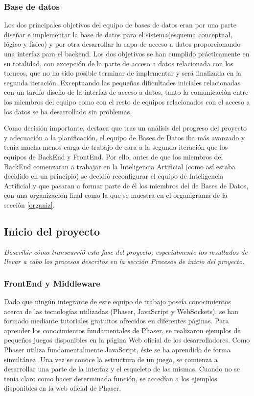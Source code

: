 \subsubsection*{Base de datos}
Los dos principales objetivos del equipo de bases de datos eran por una parte diseñar e implementar la base de datos para el sistema(esquema conceptual, lógico y físico) y por otra desarrollar la capa de acceso a datos proporcionando una interfaz para el backend. Los dos objetivos se han cumplido prácticamente en su totalidad, con excepción de la parte de acceso a datos relacionada con los torneos, que no ha sido posible terminar de implementar y será finalizada en la segunda iteración. Exceptuando las pequeñas dificultades iniciales relacionadas con un tardío diseño de la interfaz de acceso a datos, tanto la comunicación entre los miembros del equipo como con el resto de equipos relacionados con el acceso a los datos se ha desarrollado sin problemas.

Como decisión importante, destaca que tras un análisis del progreso del proyecto y adecuación a la planificación, el equipo de Bases de Datos iba más avanzado y tenía mucha menos carga de trabajo de cara a la segunda iteración que los equipos de BackEnd y FrontEnd. Por ello, antes de que los miembros del BackEnd comenzaran a trabajar en la Inteligencia Artificial (como así estaba decidido en un principio) se decidió reconfigurar el equipo de Inteligencia Artificial y que pasaran a formar parte de él los miembros del de Bases de Datos, con una organización final como la que se muestra en el organigrama de la sección \ref{organiz}.

\subsection{Inicio del proyecto}
\label{Inicio del proyecto}
\emph{Describir cómo transcurrió esta fase del proyecto, especialmente los resultados de llevar a cabo los procesos descritos en la sección Procesos de inicio del proyecto.}
\subsubsection*{FrontEnd y Middleware}
Dado que ningún integrante de este equipo de trabajo poseía conocimientos acerca de las tecnologías utilizadas (Phaser, JavaScript y WebSockets), se han formado mediante tutoriales gratuitos ofrecidos en diferentes páginas.
Para aprender los conocimientos fundamentales de Phaser, se realizaron ejemplos de pequeños juegos disponibles en la página Web oficial de los desarrolladores. Como Phaser utiliza fundamentalmente JavaScript, éste se ha aprendido de forma simultánea. Una vez se conoce la estructura de un juego, se comienza a desarrollar una parte de la interfaz y el esqueleto de las mismas. Cuando no se tenía claro como hacer determinada función, se accedían a los ejemplos disponibles en la web oficial de Phaser.

